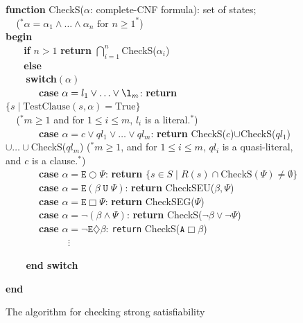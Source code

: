 \documentclass{entcs}
\begin{document}
\begin{figure}[htbp]
{{{\textbf{function} CheckS($\alpha$: complete-CNF formula): set of
states;\\
$\mbox{}\ \ \ \ \ $($^\ast\alpha=\alpha_1\wedge\ldots\wedge\alpha_n \mbox{ for }n\geq 1 ^\ast$)\\
\textbf{begin}\\
\noindent$\mbox{  }\ \ \ \ $ \textbf{if} $n>1$ \textbf{return}
$\bigcap\limits_{i=1}^n$CheckS($\alpha_i$)\\
$\mbox{  }\ \ \ \ $ \textbf{else}\\
$\mbox{}\ \ \ \ \ \ \ \ $ \textbf{switch}$(\alpha)$\\
$\mbox{ }\ \ \ \ \ \ \ \ \ \ \ $ \textbf{case}
$\alpha=l_1\vee\ldots\vee\l_m$: \textbf{return}
$\{s\;|\;\mbox{TestClause}(s,\alpha)=\mbox{True}\}$ \\
$\mbox{}\ \ \ \ \ $($^\ast
m\geq 1 $ and for $1\leq i\leq m$, $l_i$ is a literal.$^\ast$)\\
$\mbox{ }\ \ \ \ \ \ \ \ \ \ \ $ \textbf{case} $\alpha=c\vee
ql_1\vee\ldots\vee ql_m$: \textbf{return}
CheckS($c$)$\cup$CheckS($ql_1$)\\$\cup\ldots\cup$CheckS($ql_m$)
($^\ast m\geq 1 $, and for $1\leq i\leq m$, $ql_i$ is a
quasi-literal, and $c$ is a clause$.^\ast$)\\
$\mbox{ }\ \ \ \ \ \ \ \ \ \ \ $ \textbf{case}
$\alpha=\texttt{E}\bigcirc\Psi$: \textbf{return} $\{s\in
S\;|\;R(s)\cap\mbox{CheckS}(\Psi)\neq\emptyset\}$\\
$\mbox{ }\ \ \ \ \ \ \ \ \ \ \ $ \textbf{case}
$\alpha=\texttt{E}(\beta\;\texttt{U}\;\Psi)$: \textbf{return}
CheckSEU($\beta,\Psi$)\\
$\mbox{ }\ \ \ \ \ \ \ \ \ \ \ $ \textbf{case}
$\alpha=\texttt{E}\Box\Psi$: \textbf{return} CheckSEG($\Psi$)\\
$\mbox{ }\ \ \ \ \ \ \ \ \ \ \ $ \textbf{case}
$\alpha=\neg(\beta\wedge\Psi)$: \textbf{return}
CheckS($\neg\beta\vee\neg\Psi$)\\
$\mbox{ }\ \ \ \ \ \ \ \ \ \ \ $ \textbf{case}
$\alpha=\neg\texttt{E}\diamondsuit\beta$: \texttt{return}
CheckS($\texttt{A}\Box\beta$)\\
$\mbox{ }\qquad \qquad \ \ \ \ \ \ \ \ \vdots $


$\mbox{}\ \ \ \ \ \ \ \ $ \textbf{end switch}

\textbf{end}
 }
} }\caption{The algorithm for checking strong
satisfiability}\label{fig:ALG2}
\end{figure}
\end{document}

